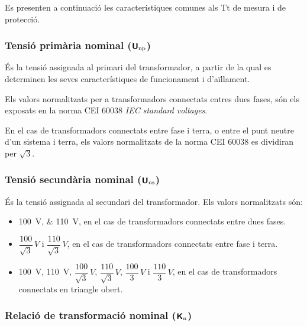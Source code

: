 Es presenten a continuació les característiques comunes als Tt de
mesura i de protecció.

\subsubsection{Tensió primària nominal (${\boldsymbol{\mathsf{U_\text{np}}}}$)}

És la tensió assignada al primari del transformador, a partir de la
qual es determinen les seves característiques de funcionament i
d'aïllament.

Els valors normalitzats per a transformadors connectats entres dues fases, són els exposats en la norma CEI 60038 \textit{IEC standard voltages}.

En el cas de transformadors connectats entre fase i terra, o entre el punt neutre d'un sistema i terra, els valors normalitzats de la norma CEI 60038 es dividiran per $\sqrt{3}$.


\subsubsection{Tensió secundària nominal (${\boldsymbol{\mathsf{U_\text{ns}}}}$)}

És la tensió assignada al secundari del transformador.
Els valors normalitzats són:
\begin{itemize}
    \item \qtylist{100;110}{V}, en el cas de transformadors connectats
    entre dues fases.
    \item $\dfrac{100}{\sqrt{3}}\si{\,V}$ i
        $\dfrac{110}{\sqrt{3}}\si{\,V}$, en el cas de transformadors
        connectats entre fase i terra.
    \item \qty{100}{V}, \qty{110}{V}, $\dfrac{100}{\sqrt{3}}\si{\,V}$,
    $\dfrac{110}{\sqrt{3}}\si{\,V}$, $\dfrac{100}{3}\si{\,V}$   i
    $\dfrac{110}{3}\si{\,V}$, en el cas de transformadors
    connectats en triangle obert.
\end{itemize}

\subsubsection{Relació de transformació nominal (${\boldsymbol{\mathsf{K_\text{n}}}}$)}

